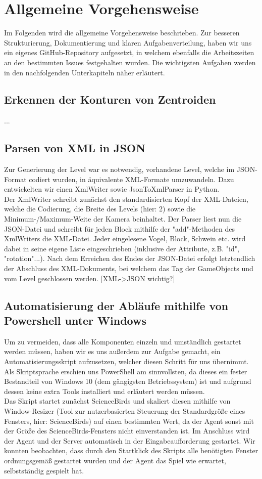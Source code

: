 \documentclass[11pt]{article}
\begin{document}
\section{Allgemeine Vorgehensweise}
Im Folgenden wird die allgemeine Vorgehensweise beschrieben. Zur besseren Strukturierung, Dokumentierung und klaren Aufgabenverteilung, haben wir uns ein eigenes GitHub-Repository aufgesetzt, in welchem ebenfalls die Arbeitszeiten an den bestimmten Issues festgehalten wurden. Die wichtigsten Aufgaben werden in den nachfolgenden Unterkapiteln näher erläutert.
\subsection{Erkennen der  Konturen von Zentroiden}
...
\subsection{Parsen von XML in JSON}
Zur Generierung der Level war es notwendig, vorhandene Level, welche im JSON-Format codiert wurden, in äquivalente XML-Formate umzuwandeln. Dazu entwickelten wir einen XmlWriter sowie JsonToXmlParser in Python. \\ Der XmlWriter schreibt zunächst den standardisierten Kopf der XML-Dateien, welche die Codierung, die Breite des Levels (hier: 2) sowie die Minimum-/Maximum-Weite der Kamera beinhaltet. Der Parser liest nun die JSON-Datei und schreibt für jeden Block mithilfe der "add"-Methoden des XmlWriters die XML-Datei. Jeder eingelesene Vogel, Block, Schwein etc. wird dabei in seine eigene Liste eingeschrieben (inklusive der Attribute, z.B. "id", "rotation"...). Nach dem Erreichen des Endes der JSON-Datei erfolgt letztendlich der Abschluss des XML-Dokuments, bei welchem das Tag der GameObjects und vom Level geschlossen werden. [XML->JSON wichtig?]
\subsection{Automatisierung der Abläufe mithilfe von Powershell unter Windows}
Um zu vermeiden, dass alle Komponenten einzeln und umständlich gestartet werden müssen, haben wir es uns außerdem zur Aufgabe gemacht, ein Automatisierungsskript aufzusetzen, welcher diesen Schritt für uns übernimmt. Als Skriptsprache erschien uns PowerShell am sinnvollsten, da dieses ein fester Bestandteil von Windows 10 (dem gängigsten Betriebssystem) ist und aufgrund dessen keine extra Tools installiert und erläutert werden müssen. \\Das Skript startet zunächst ScienceBirds und skaliert diesen mithilfe von Window-Resizer (Tool zur nutzerbasierten Steuerung der Standardgröße eines Fensters, hier: ScienceBirds) auf einen bestimmten Wert, da der Agent sonst mit der Größe des ScienceBirds-Fensters nicht einverstanden ist. Im Anschluss wird der Agent und der Server automatisch in der Eingabeaufforderung gestartet. Wir konnten beobachten, dass durch den Startklick des Skripts alle benötigten Fenster ordnungsgemäß gestartet wurden und der Agent das Spiel wie erwartet, selbstständig gespielt hat.
\end{document}
